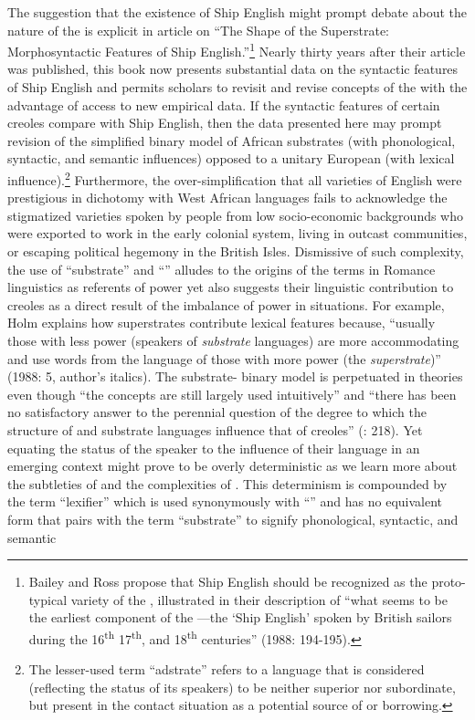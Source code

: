 The suggestion that the existence of Ship English might prompt debate about the nature of the  is explicit in 
article on “The Shape of the Superstrate: Morphosyntactic Features of Ship English.”\footnote{Bailey and Ross propose that Ship English should be recognized as the proto-typical variety of the , illustrated in their description of “what seems to be the earliest component of the —the ‘Ship English’ spoken by British sailors during the 16\textsuperscript{th} 17\textsuperscript{th}, and 18\textsuperscript{th} centuries” (1988: 194-195).}  Nearly thirty years after their article was published, this book now presents substantial data on the syntactic features of Ship English and permits scholars to revisit and revise concepts of the  with the advantage of access to new empirical data. If the syntactic features of certain creoles compare with Ship English, then the data presented here may prompt revision of the simplified binary model of African substrates (with phonological, syntactic, and semantic influences) opposed to a unitary European  (with lexical influence).\footnote{The lesser-used term “adstrate” refers to a language that is considered (reflecting the status of its speakers) to be neither superior nor subordinate, but present in the contact situation as a potential source of  or borrowing.}  Furthermore, the over-simplification that all varieties of English were prestigious in dichotomy with West African languages fails to acknowledge the stigmatized varieties spoken by people from low socio-economic backgrounds who were exported to work in the early colonial system, living in outcast communities, or escaping political hegemony in the British Isles. Dismissive of such complexity, the use of “substrate” and “” alludes to the origins of the terms in Romance linguistics as referents of power yet also suggests their linguistic contribution to creoles as a direct result of the imbalance of power in  situations. For example, Holm explains how superstrates contribute lexical features because, “usually those with less power (speakers of \textit{substrate} languages) are more accommodating and use words from the language of those with more power (the \textit{superstrate})” (1988: 5, author’s italics). The substrate- binary model is perpetuated in  theories even though “the concepts are still largely used intuitively” \citep[55]{Selbach2008} and “there has been no satisfactory answer to the perennial question of the degree to which the structure of  and substrate languages influence that of creoles” (\citealt{Holm2009}: 218). Yet equating the status of the speaker to the influence of their language in an emerging  context might prove to be overly deterministic as we learn more about the subtleties of  and the complexities of . This determinism is compounded by the term “lexifier” which is used synonymously with “” and has no equivalent form that pairs with the term “substrate” to signify phonological, syntactic, and semantic 